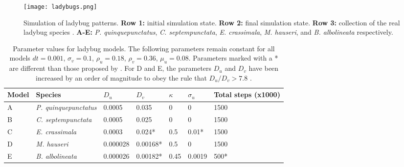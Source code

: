 \begin{figure}[!ht]
	\centering
	\texttt{[image: ladybugs.png]}
	\caption{Simulation of ladybug patterns. \textbf{Row 1:} initial simulation state. \textbf{Row 2:} final simulation state. \textbf{Row 3:} collection of the real ladybug species \citep{Chen2008}. \textbf{A-E:} \textit{P. quinquepunctatus}, \textit{C. septempunctata}, \textit{E. crassimala}, \textit{M. hauseri}, and \textit{B. albolineata} respectively. }
	\label{fig:ladyBugPatterns}
\end{figure}

\begin{table}[p]
	\centering
	\begin{tabular}{|l|l|l|l|l|l|l|}
	\hline
	Model & Species                    &$D_u$   &$D_v$    &$\kappa$ &$\sigma_u$ &Total steps (x1000)\\ \hline 
	A     &\textit{P. quinquepunctatus}&0.0005  &0.035    &0        &0          & 1500              \\ \hline
	B     &\textit{C. septempunctata}  &0.0005  &0.025    &0        &0          & 1500              \\ \hline
	C     &\textit{E. crassimala}      &0.0003  &0.024*   &0.5      &0.01*      & 1500              \\ \hline
	D     &\textit{M. hauseri}         &0.000028&0.00168* &0.5      &0          & 1500              \\ \hline
	E     &\textit{B. albolineata}     &0.000026&0.00182* &0.45     &0.0019     & 500*              \\
	\hline
	\end{tabular}
	\caption {Parameter values for ladybug models. The following parameters remain constant for all models $dt = 0.001$, $\sigma_v= 0.1$, $\rho_u = 0.18$, $\rho_v = 0.36$, $\mu_u = 0.08$. Parameters marked with a * are different than those proposed by \citep{Liaw2001}. For D and E, the parameters $D_u$ and $D_v$ have been increased by an order of magnitude to obey the rule that $D_u / D_v > 7.8$ \citep{Liaw2001}.}
	\label{tab:ladyBugParameters}
\end{table}

